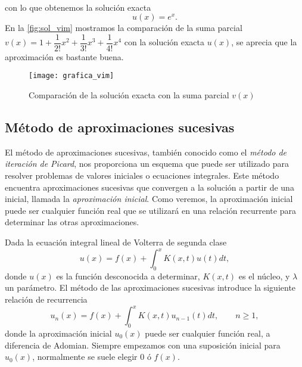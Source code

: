 \begin{ejemplo}
\begin{align}
	\end{align}
	con lo que obtenemos la solución exacta
	\begin{equation}
		u(x) = e^x.
	\end{equation}
	En la \autoref{fig:sol_vim} mostramos la comparación de la suma parcial $v(x) = 1 + \dfrac{1}{2!}x^2 + \dfrac{1}{3!}x^3+\dfrac{1}{4!}x^4$ con la solución exacta $u(x)$, se aprecia que la aproximación es bastante buena.
	\begin{figure}[h!]
		\centering
		\texttt{[image: grafica\_vim]}
		\caption{Comparación de la solución exacta con la suma parcial $v(x)$}
		\label{fig:sol_vim}
	\end{figure}
\end{ejemplo}

\subsection{Método de aproximaciones sucesivas}
El método de aproximaciones sucesivas, también conocido como el \textit{método de iteración de Picard}, nos proporciona un esquema que puede ser utilizado para resolver problemas de valores iniciales o ecuaciones integrales. Este método encuentra aproximaciones sucesivas que convergen a la solución a partir de una inicial, llamada la \textit{aproximación inicial}. Como veremos, la aproximación inicial puede ser cualquier función real que se utilizará en una relación recurrente para determinar las otras aproximaciones.

Dada la ecuación integral lineal de Volterra de segunda clase
\begin{equation}
	u(x) = f(x) +\int_{0}^{x} K(x,t)u(t)dt,
\end{equation}
donde $u(x)$ es la función desconocida a determinar, $K(x,t)$ es el núcleo, y $\lambda$ un parámetro. El método de las aproximaciones sucesivas introduce la siguiente relación de recurrencia
\begin{equation}\label{eq:wowo}
	u_n(x) = f(x) + \int_{0}^{x} K(x,t)u_{n-1}(t)dt, \qquad n \geqslant 1,
\end{equation}
donde la aproximación inicial $u_0(x)$ puede ser cualquier función real, a diferencia de Adomian. Siempre empezamos con una suposición inicial para $u_0(x)$, normalmente se suele elegir $0$ ó $f(x)$.

